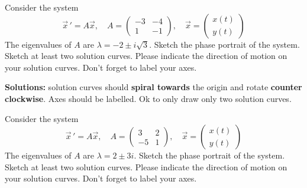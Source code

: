 \ifnum {}
\question[3] Consider the system $$\vec x \, ' = A\vec x, \quad A = \begin{pmatrix} -3&-4\\1&-1 \end{pmatrix}, \quad \vec x = \begin{pmatrix} x(t)\\y(t)\end{pmatrix} $$ The eigenvalues of $A$ are $\lambda = -2\pm i\sqrt 3$. Sketch the phase portrait of the system. Sketch at least two solution curves. Please indicate the direction of motion on your solution curves. Don't forget to label your axes.   

\ifnum {} {\color{DarkBlue} 
\textbf{Solutions:} solution curves should \textbf{spiral towards} the origin and rotate \textbf{counter clockwise}. Axes should be labelled. Ok to only draw only two solution curves. 
    \begin{center}
    \end{center} 
} 
\else 
    \begin{center}
    \end{center} 
\fi
\fi


\ifnum {}
\question[3] Consider the system $$\vec x \, ' = A\vec x, \quad A = \begin{pmatrix} 3&2\\-5&1 \end{pmatrix}, \quad \vec x = \begin{pmatrix} x(t)\\y(t)\end{pmatrix} $$ The eigenvalues of $A$ are $\lambda = 2\pm  3i$. Sketch the phase portrait of the system. Sketch at least two solution curves. Please indicate the direction of motion on your solution curves. Don't forget to label your axes.   

